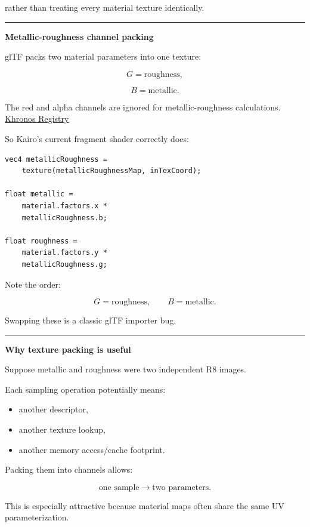 rather than treating every material texture identically.

\begin{center}\rule{0.5\linewidth}{0.5pt}\end{center}

\textbf{Metallic-roughness channel packing}

glTF packs two material parameters into one texture:

\[
G=\text{roughness},
\]

\[
B=\text{metallic}.
\]

The red and alpha channels are ignored for metallic-roughness calculations. \href{https://registry.khronos.org/glTF/specs/2.0/glTF-2.0.html?utm_source=chatgpt.com}{Khronos Registry}

So Kairo's current fragment shader correctly does:

\begin{verbatim}
vec4 metallicRoughness =
    texture(metallicRoughnessMap, inTexCoord);

float metallic =
    material.factors.x *
    metallicRoughness.b;

float roughness =
    material.factors.y *
    metallicRoughness.g;
\end{verbatim}

Note the order:

\[
\boxed{
G=\text{roughness},\qquad B=\text{metallic}.
}
\]

Swapping these is a classic glTF importer bug.

\begin{center}\rule{0.5\linewidth}{0.5pt}\end{center}

\textbf{Why texture packing is useful}

Suppose metallic and roughness were two independent R8 images.

Each sampling operation potentially means:

\begin{itemize}
\tightlist
\item
  another descriptor,
\item
  another texture lookup,
\item
  another memory access/cache footprint.
\end{itemize}

Packing them into channels allows:

\[
\text{one sample}
\rightarrow
\text{two parameters}.
\]

This is especially attractive because material maps often share the same UV parameterization.


